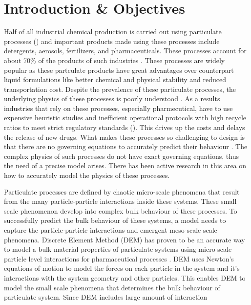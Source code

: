 \documentclass[preprint,11pt,authoryear]{elsarticle}
\begin{document}
	\section{Introduction \& Objectives} 
	\par Half of all industrial chemical production is carried out using particulate processes 
    (\cite{seville1997}) and important products made using these processes include detergents, 
    aerosols, fertilizers, and pharmaceuticals. These processes account for about 70\% of the products 
    of such industries \citep{Litster2016}. These processes are widely popular as these partculate 
    products have great advantages over counterpart liquid formulations like better chemical and 
    physical stability and reduced transportation cost. Despite the prevalence of these particulate 
    processes, the underlying physics of these procesess is poorly understood \citep{Rogers2013}. As a 
    results industries that rely on these processes, especially pharmecutical, have to use expensive 
    heuristic studies and inefficient operational protocols with high recycle ratios to meet strict 
    regulatory standards (\cite{Ramachandran2009}). This drives up the costs and delays the release of 
    new drugs. What makes these processes so challenging to design is that there are no governing 
    equations to accurately predict their behaviour \citep{sen2013}. The complex physics of such 
    processes do not have exact governing equations, thus the need of a precise model arises. There 
    has been active research in this area on how to accurately model the  physics of these processes.
	\par Particulate processes are defined by chaotic micro-scale phenomena that result from the many 
    particle-particle interactions inside these systems. These small scale phenomenon develop into 
    complex bulk behaviour of these processes. To successfully predict the bulk behaviour of these 
    systems, a model needs to capture the particle-particle interactions and emergent meso-scale scale 
    phenomena. Discrete Element Method (DEM)\citep{Cundall1979} has proven to be an accurate way 
    to  model a bulk material properties of particulate systems using micro-scale particle level 
    interactions for pharmaceutical processes \citep{Hancock2011}. DEM uses Newton's equations of 
    motion to model the forces on each particle in the system and it's interactions with the system 
    geometry and other particles. This enables DEM to model the small scale phenomena that 
    determines the bulk behaviour of particulate system. Since DEM includes large amount of interaction 
\end{document}
